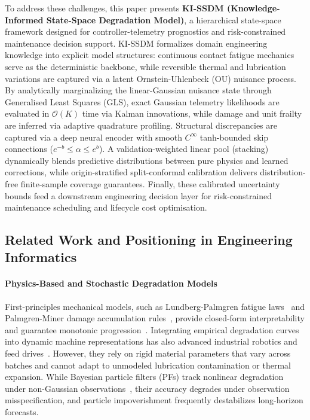 \documentclass[a4paper,fleqn]{cas-dc}
\begin{document}
To address these challenges, this paper presents \textbf{KI-SSDM (Knowledge-Informed State-Space Degradation Model)}, a hierarchical state-space framework designed for controller-telemetry prognostics and risk-constrained maintenance decision support. KI-SSDM formalizes domain engineering knowledge into explicit model structures: continuous contact fatigue mechanics serve as the deterministic backbone, while reversible thermal and lubrication variations are captured via a latent Ornstein-Uhlenbeck (OU) nuisance process. By analytically marginalizing the linear-Gaussian nuisance state through Generalised Least Squares (GLS), exact Gaussian telemetry likelihoods are evaluated in $\mathcal{O}(K)$ time via Kalman innovations, while damage and unit frailty are inferred via adaptive quadrature profiling. Structural discrepancies are captured via a deep neural encoder with smooth $C^\infty$ tanh-bounded skip connections ($e^{-b} \le \alpha \le e^b$). A validation-weighted linear pool (stacking) dynamically blends predictive distributions between pure physics and learned corrections, while origin-stratified split-conformal calibration delivers distribution-free finite-sample coverage guarantees. Finally, these calibrated uncertainty bounds feed a downstream engineering decision layer for risk-constrained maintenance scheduling and lifecycle cost optimisation.

\subsection{Related Work and Positioning in Engineering Informatics}
\label{subsec:related}

\paragraph{Physics-Based and Stochastic Degradation Models}
First-principles mechanical models, such as Lundberg-Palmgren fatigue laws~\cite{Lundberg_1947} and Palmgren-Miner damage accumulation rules~\cite{Miner_1945}, provide closed-form interpretability and guarantee monotonic progression~\cite{Lei_2018, H_Li_2024, Yan_2021, N_Zhang_2024, Yucesan_2021}. Integrating empirical degradation curves into dynamic machine representations has also advanced industrial robotics and feed drives~\cite{Aivaliotis_2021, Tai_2023, Wan_2025}. However, they rely on rigid material parameters that vary across batches and cannot adapt to unmodeled lubrication contamination or thermal expansion. While Bayesian particle filters (PFs) track nonlinear degradation under non-Gaussian observations~\cite{Deng_2020, Yan_2021}, their accuracy degrades under observation misspecification, and particle impoverishment frequently destabilizes long-horizon forecasts.
\end{document}

